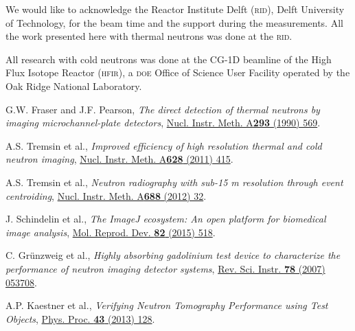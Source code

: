 \documentclass[a4paper,11pt]{article}
\begin{document}
\acknowledgments
We would like to acknowledge the Reactor Institute Delft (\textsc{rid}), Delft University of Technology, for the beam time and the support during the measurements.
All the work presented here with thermal neutrons was done at the \textsc{rid}.

All research with cold neutrons was done at the CG-1D beamline of the High Flux Isotope Reactor (\textsc{hfir}), a \textsc{doe} Office of Science User Facility operated by the Oak Ridge National Laboratory.

\begin{thebibliography}{99}

G.W. Fraser and J.F. Pearson, \emph{The direct detection of thermal neutrons by imaging microchannel-plate detectors}, \href{https://doi.org/10.1016/0168-9002(90)90325-Z}{Nucl. Instr. Meth. A\textbf{293} (1990) 569}.

A.S. Tremsin et al., \emph{Improved efficiency of high resolution thermal and cold neutron imaging}, \href{https://doi.org/10.1016/j.nima.2010.07.014}{Nucl. Instr. Meth. A\textbf{628} (2011) 415}.

A.S. Tremsin et al., \emph{Neutron radiography with sub-15 \textmu m resolution through event centroiding}, \href{https://doi.org/10.1016/j.nima.2012.06.005}{Nucl. Instr. Meth. A\textbf{688} (2012) 32}.

J. Schindelin et al., \emph{The ImageJ ecosystem: An open platform for biomedical image analysis}, \href{https://dx.doi.org/10.1002/mrd.22489}{Mol. Reprod. Dev. \textbf{82} (2015) 518}.

C. Gr\"unzweig et al., \emph{Highly absorbing gadolinium test device to characterize the performance of neutron imaging detector systems}, \href{https://doi.org/10.1063/1.2736892}{Rev. Sci. Instr. \textbf{78} (2007) 053708}.

A.P. Kaestner et al., \emph{Verifying Neutron Tomography Performance using Test Objects}, \href{https://doi.org/10.1016/j.phpro.2013.03.016}{Phys. Proc. \textbf{43} (2013) 128}.

\end{thebibliography}
\end{document}
